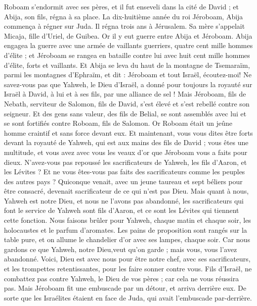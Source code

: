 \begin{multicols}{2}
Roboam s'endormit avec ses pères, et il fut enseveli dans la cité de David ; et Abija, son fils, régna à sa place.
\VerseOne{}La dix-huitième année du roi Jéroboam, Abija commença à régner sur Juda.
Il régna trois ans à Jérusalem. Sa mère s'appelait Micaja, fille d'Uriel, de Guibea. Or il y eut guerre entre Abija et Jéroboam.
Abija engagea la guerre avec une armée de vaillants guerriers, quatre cent mille hommes d'élite ; et Jéroboam se rangea en bataille contre lui avec huit cent mille hommes d'élite, forts et vaillants.
Et Abija se leva du haut de la montagne de Tsemaraïm, parmi les montagnes d'Ephraïm, et dit : Jéroboam et tout Israël, écoutez-moi!
Ne savez-vous pas que Yahweh, le Dieu d'Israël, a donné pour toujours la royauté sur Israël à David, à lui et à ses fils, par une alliance de sel !
Mais Jéroboam, fils de Nebath, serviteur de Salomon, fils de David, s'est élevé et s'est rebellé contre son seigneur.
Et des gens sans valeur, des fils de Belial, se sont assemblés avec lui et se sont fortifiés contre Roboam, fils de Salomon. Or Roboam était un jeûne homme craintif et sans force devant eux.
Et maintenant, vous vous dites être forts devant la royauté de Yahweh, qui est aux mains des fils de David ; vous êtes une multitude, et vous avez avec vous les veaux d'or que Jéroboam vous a faits pour dieux.
N'avez-vous pas repoussé les sacrificateurs de Yahweh, les fils d'Aaron, et les Lévites ? Et ne vous êtes-vous pas faits des sacrificateurs comme les peuples des autres pays ? Quiconque venait, avec un jeune taureau et sept béliers pour être consacré, devenait sacrificateur de ce qui n'est pas Dieu.
Mais quant à nous, Yahweh est notre Dieu, et nous ne l'avons pas abandonné, les sacrificateurs qui font le service de Yahweh sont fils d'Aaron, et ce sont les Lévites qui tiennent cette fonction.
Nous faisons brûler pour Yahweh, chaque matin et chaque soir, les holocaustes et le parfum d'aromates. Les pains de proposition sont rangés sur la table pure, et on allume le chandelier d'or avec ses lampes, chaque soir. Car nous gardons ce que Yahweh, notre Dieu,veut qu'on garde ; mais vous, vous l'avez abandonné.
Voici, Dieu est avec nous pour être notre chef, avec ses sacrificateurs, et les trompettes retentissantes, pour les faire sonner contre vous. Fils d'Israël, ne combattez pas contre Yahweh, le Dieu de vos pères ; car cela ne vous réussira pas.
Mais Jéroboam fit une embuscade par un détour, et arriva derrière eux. De sorte que les Israélites étaient en face de Juda, qui avait l'embuscade par-derrière.

\end{multicols}
